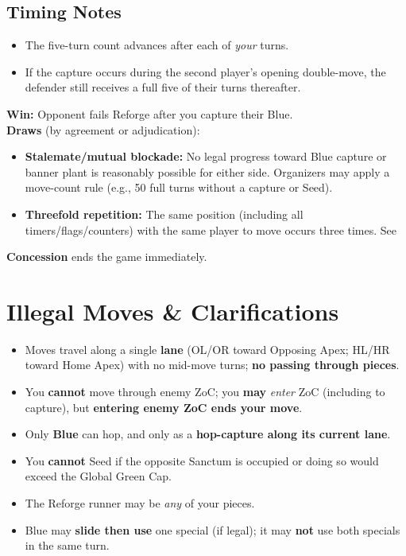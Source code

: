 \documentclass[11pt]{article}
\begin{document}
\subsection*{Timing Notes}
\begin{itemize}
  \item The five-turn count advances after each of \emph{your} turns.
  \item If the capture occurs during the second player’s opening double-move, the defender still receives a full five of their turns thereafter.
\end{itemize}

\textbf{Win:} Opponent fails Reforge after you capture their Blue.\\
\textbf{Draws} (by agreement or adjudication):
\begin{itemize}
  \item \textbf{Stalemate/mutual blockade:} No legal progress toward Blue capture or banner plant is reasonably possible for either side. Organizers may apply a move-count rule (e.g., 50 full turns without a capture or Seed).
  \item \textbf{Threefold repetition:} The same position (including all timers/flags/counters) with the same player to move occurs three times. See 
\end{itemize}
\textbf{Concession} ends the game immediately.

\section{Illegal Moves \& Clarifications}
\label{sec:clarifications}

\begin{itemize}
  \item Moves travel along a single \textbf{lane} (OL/OR toward Opposing Apex; HL/HR toward Home Apex) with no mid-move turns; \textbf{no passing through pieces}.
  \item You \textbf{cannot} move through enemy ZoC; you \textbf{may} \emph{enter} ZoC (including to capture), but \textbf{entering enemy ZoC ends your move}.
  \item Only \textbf{Blue} can hop, and only as a \textbf{hop-capture along its current lane}.
  \item You \textbf{cannot} Seed if the opposite Sanctum is occupied or doing so would exceed the Global Green Cap.
  \item The Reforge runner may be \emph{any} of your pieces.
  \item Blue may \textbf{slide then use} one special (if legal); it may \textbf{not} use both specials in the same turn.
\end{itemize}
\end{document}
